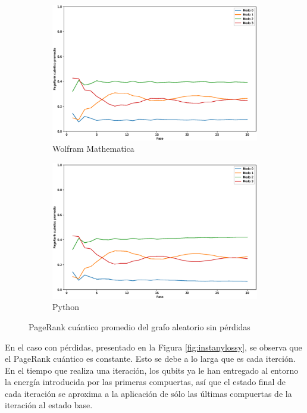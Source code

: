 \begin{figure}[H]
    \centering
    \begin{subfigure}[m]{0.45\textwidth}
        \centering
        \includegraphics[width=0.9\linewidth]{img/any-mean-M.eps}
        \caption{Wolfram Mathematica}
    \end{subfigure}
    \begin{subfigure}[m]{0.45\textwidth}
        \centering
        \includegraphics[width=0.9\linewidth]{img/any-mean-lossless.eps}
        \caption{Python}
    \end{subfigure}
    \caption[PageRank cuántico promedio del grafo aleatorio sin pérdidas]{PageRank cuántico promedio del grafo aleatorio sin pérdidas}
    \label{fig:meananylossless}
\end{figure}

En el caso con pérdidas, presentado en la Figura \ref{fig:instanylossy}, se observa que el PageRank cuántico es constante. Esto se debe a lo larga que es cada iterción. En el tiempo que realiza una iteración, los qubits ya le han entregado al entorno la energía introducida por las primeras compuertas, así que el estado final de cada iteración se aproxima a la aplicación de sólo las últimas compuertas de la iteración al estado base.

